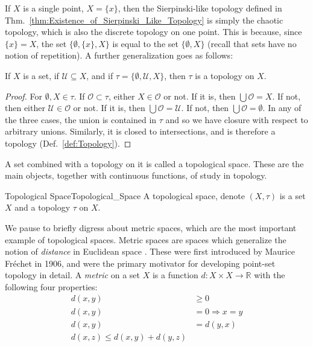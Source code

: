     If $X$ is a single point, $X=\{x\}$, then the Sierpinski-like topology
    defined in Thm.~\ref{thm:Existence_of_Sierpinski_Like_Topology} is simply
    the chaotic topology, which is also the discrete topology on one point.
    This is because, since $\{x\}=X$, the set $\{\emptyset,\{x\},X\}$ is equal
    to the set $\{\emptyset,X\}$ (recall that sets have no notion of
    repetition). A further generalization goes as follows:
    \begin{theorem}
        \label{thm:Existence_of_Generalized_Sierpinski_Like_Topology}
        If $X$ is a set, if $\mathcal{U}\subseteq{X}$, and if
        $\tau=\{\emptyset,\mathcal{U},X\}$, then $\tau$ is a topology
        on $X$.
    \end{theorem}
    \begin{proof}
        For $\emptyset,X\in\tau$. If $\mathcal{O}\subset\tau$, either
        $X\in\mathcal{O}$ or not. If it is, then $\bigcup\mathcal{O}=X$.
        If not, then either $\mathcal{U}\in\mathcal{O}$ or not. If it is,
        then $\bigcup\mathcal{O}=\mathcal{U}$. If not, then
        $\bigcup\mathcal{O}=\emptyset$. In any of the three cases, the union is
        contained in $\tau$ and so we have closure with respect to arbitrary
        unions. Similarly, it is closed to intersections, and is therefore a
        topology (Def.~\ref{def:Topology}).
    \end{proof}
    A set combined with a topology on it is called a topological space. These
    are the main objects, together with continuous functions, of study in
    topology.
    \begin{fdefinition}{Topological Space}{Topological_Space}
        A \gls{topological space}, denote $(X,\tau)$ is a \gls{set} $X$ and a
        \gls{topology} $\tau$ on $X$.
    \end{fdefinition}
    We pause to briefly digress about metric spaces, which are the most
    important example of topological spaces. Metric spaces are spaces which
    generalize the notion of \textit{distance} in Euclidean space%
    . These were first introduced by
    Maurice Fr\'{e}chet in 1906, and were the primary motivator for developing
    point-set topology in detail. A \textit{metric} on a set $X$
    is a function $d:X\times{X}\rightarrow\mathbb{R}$ with the following four
    properties:
    \begin{align}
        d(x,y)&\geq{0}
        \tag{Positivity}\\
        d(x,y)&=0\Longrightarrow{x=y}
        \tag{Definiteness}\\
        d(x,y)&=d(y,x)
        \tag{Symmetry}\\
        d(x,z)\leq{d}(x,y)+d(y,z)
        \tag{Triangle Inequality}
    \end{align}
